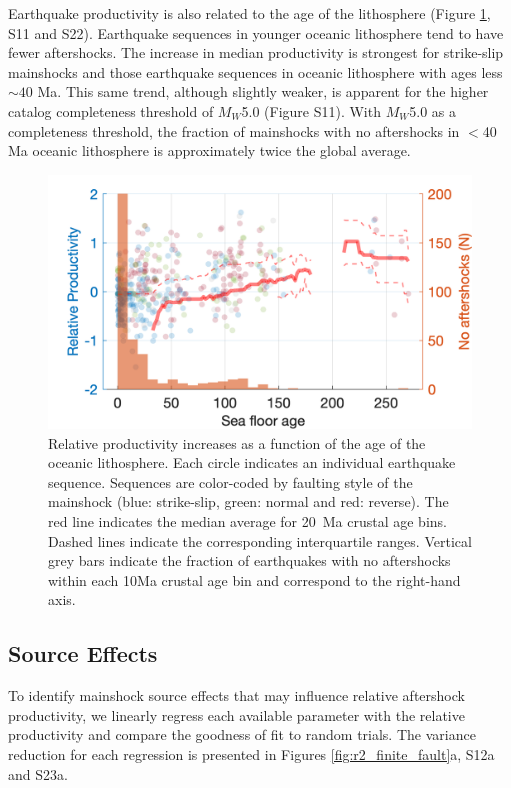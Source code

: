 \documentclass[draft, jgrga]{agujournal2018}
\begin{document}
    Earthquake productivity is also related to the age of the lithosphere  (Figure \ref{fig:prod_vs_age}, S11 and S22). Earthquake sequences in younger oceanic lithosphere tend to have fewer aftershocks. The increase in median productivity is strongest for strike-slip mainshocks and those earthquake sequences in oceanic lithosphere with ages less $\sim 40$ Ma. This same trend, although slightly weaker, is apparent for the higher catalog completeness threshold of $M_W$5.0 (Figure S11). With $M_W$5.0 as a completeness threshold, the fraction of mainshocks with no aftershocks in $<$40 Ma oceanic lithosphere is approximately twice the global average.

    \begin{figure}
        \centering
        \includegraphics{prod_vs_age.png}
        \caption{Relative productivity increases as a function of the age of the oceanic lithosphere. Each circle indicates an individual earthquake sequence. Sequences are color-coded by faulting style of the mainshock (blue: strike-slip, green: normal and red: reverse). The red line indicates the median average for 20~Ma crustal age bins. Dashed lines indicate the corresponding interquartile ranges. Vertical grey bars indicate the fraction of earthquakes with no aftershocks within each 10Ma crustal age bin and correspond to the right-hand axis.}
        \label{fig:prod_vs_age}
    \end{figure}

    \subsection{Source Effects}\label{sec:source_parameters}

    To identify mainshock source effects that may influence relative aftershock productivity, we linearly regress each available parameter with the relative productivity and compare the goodness of fit to random trials. The variance reduction for each regression is presented in Figures \ref{fig:r2_finite_fault}a, S12a and S23a.
\end{document}
